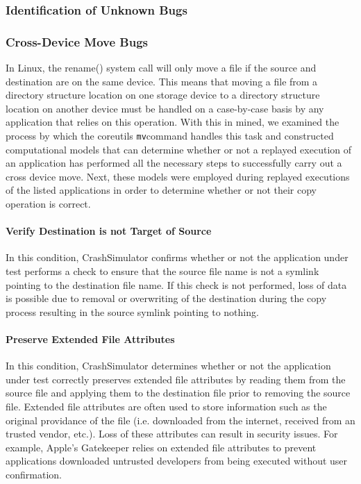         \subsubsection{Identification of Unknown Bugs}

        \subsubsection{Cross-Device Move Bugs}

        In Linux, the rename() system call will only move a file if the source and destination are on the same device.
        This means that moving a file from a directory structure location on one storage device to a directory structure location on
        another device must be handled on a case-by-case basis by any application that relies on this operation.  With
        this in mined, we examined the process by which the coreutils {\tt mv}command handles this task and constructed
        computational models that can determine whether or not a replayed execution of an application has performed all
        the necessary steps to successfully carry out a cross device move.  Next, these models were employed during
        replayed executions of the listed applications in order to determine whether or not their copy operation is correct.

        \paragraph{Verify Destination is not Target of Source}

        In this condition, CrashSimulator confirms whether or not the application under test performs a check to ensure
        that the source file name is not a symlink pointing to the destination file name.  If this check is not
        performed, loss of data is possible due to removal or overwriting of the destination during the copy process
        resulting in the source symlink pointing to nothing.

        \paragraph{Preserve Extended File Attributes}

        In this condition, CrashSimulator determines whether or not the application under test correctly preserves
        extended file attributes by reading them from the source file and applying them to the destination file prior to
        removing the source file.  Extended file attributes are often used to store information such as the original
        providance of the file (i.e. downloaded from the internet, received from an trusted vendor, etc.).  Loss of
        these attributes can result in security issues. For example, Apple's Gatekeeper relies on extended file
        attributes to prevent applications downloaded untrusted developers from being executed without user
        confirmation.

